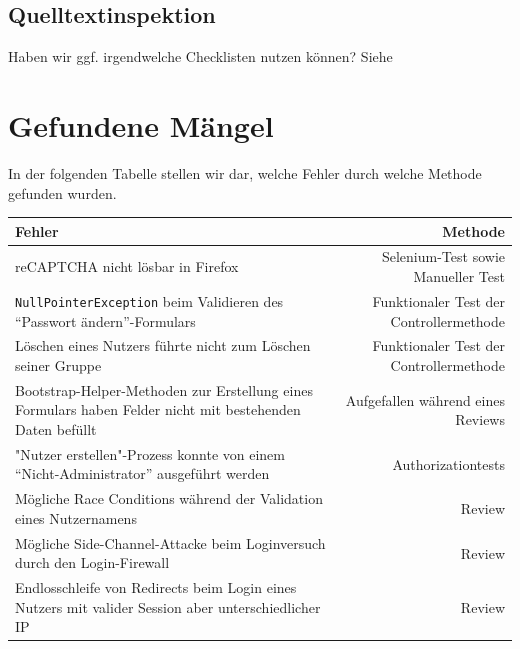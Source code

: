 \documentclass[12pt,DIV14,BCOR10mm,a4paper,parskip=half-,headsepline,headinclude,english,ngerman,bibliography=totocnumbered]{scrreprt}
\begin{document}
\section{Quelltextinspektion}

Haben wir ggf. irgendwelche Checklisten nutzen können?
Siehe

\chapter{Gefundene Mängel}

In der folgenden Tabelle stellen wir dar, welche Fehler durch welche Methode gefunden wurden.

\begin{table}[ht]
   \label{tab:title}
  \begin{tabularx}{\textwidth}{| X | r |}
  \hline
  \textbf{Fehler} & \textbf{Methode} \\ \hline
  reCAPTCHA nicht lösbar in Firefox & Selenium-Test sowie Manueller Test \\ \hline
  \texttt{NullPointerException} beim Validieren des \enquote{Passwort ändern}-Formulars & Funktionaler Test der Controllermethode \\ \hline
  Löschen eines Nutzers führte nicht zum Löschen seiner Gruppe & Funktionaler Test der Controllermethode \\ \hline
  Bootstrap-Helper-Methoden zur Erstellung eines Formulars haben Felder nicht mit bestehenden Daten befüllt & Aufgefallen während eines Reviews \\ \hline
  "Nutzer erstellen"-Prozess konnte von einem \enquote{Nicht-Administrator} ausgeführt werden & Authorizationtests \\ \hline
  Mögliche Race Conditions während der Validation eines Nutzernamens & Review \\ \hline
  Mögliche Side-Channel-Attacke beim Loginversuch durch den Login-Firewall & Review \\ \hline
  Endlosschleife von Redirects beim Login eines Nutzers mit valider Session aber unterschiedlicher IP & Review \\ \hline

  \end{tabularx}
\end{table}

\printbibliography
\end{document}
